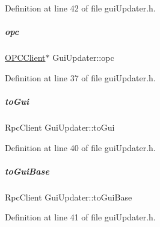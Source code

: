 Definition at line 42 of file gui\+Updater.\+h.

\mbox{\label{group__guiUpdater_a9e03b8ddad16217a222dd71e4aba7966}} 
\subparagraph{\texorpdfstring{opc}{opc}}
{\footnotesize\ttfamily \hyperlink{group__icubclient__clients_classicubclient_1_1OPCClient}{O\+P\+C\+Client}$\ast$ Gui\+Updater\+::opc\hspace{0.3cm}{\ttfamily [protected]}}



Definition at line 37 of file gui\+Updater.\+h.

\mbox{\label{group__guiUpdater_ac2c199bbf945af098d5bd2ddd909415e}} 
\subparagraph{\texorpdfstring{to\+Gui}{toGui}}
{\footnotesize\ttfamily Rpc\+Client Gui\+Updater\+::to\+Gui\hspace{0.3cm}{\ttfamily [protected]}}



Definition at line 40 of file gui\+Updater.\+h.

\mbox{\label{group__guiUpdater_a78035e8447f5c04203916e9e727b2805}} 
\subparagraph{\texorpdfstring{to\+Gui\+Base}{toGuiBase}}
{\footnotesize\ttfamily Rpc\+Client Gui\+Updater\+::to\+Gui\+Base\hspace{0.3cm}{\ttfamily [protected]}}



Definition at line 41 of file gui\+Updater.\+h.

